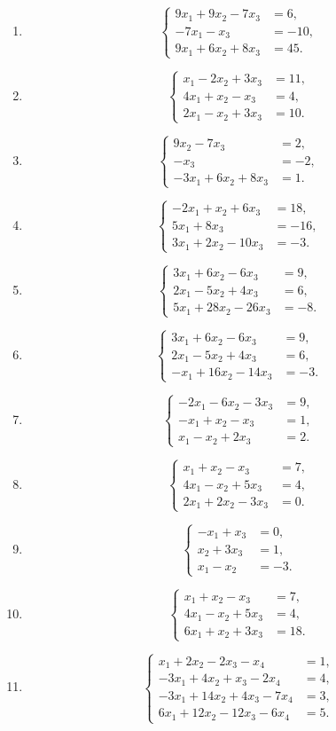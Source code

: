 \documentclass[12pt]{article}
\newcommand{\sistema}[1]{%
\[
\left\{
\begin{aligned}
#1
\end{aligned}
\right.
\]
}
\begin{document}
\begin{enumerate}[label=\textbf{\arabic*.},leftmargin=*]

\item \sistema{
9x_1+9x_2-7x_3&=6,\\
-7x_1-x_3&=-10,\\
9x_1+6x_2+8x_3&=45.
}

\item \sistema{
x_1-2x_2+3x_3&=11,\\
4x_1+x_2-x_3&=4,\\
2x_1-x_2+3x_3&=10.
}

\item \sistema{
9x_2-7x_3&=2,\\
-x_3&=-2,\\
-3x_1+6x_2+8x_3&=1.
}

\item \sistema{
-2x_1+x_2+6x_3&=18,\\
5x_1+8x_3&=-16,\\
3x_1+2x_2-10x_3&=-3.
}

\item \sistema{
3x_1+6x_2-6x_3&=9,\\
2x_1-5x_2+4x_3&=6,\\
5x_1+28x_2-26x_3&=-8.
}

\item \sistema{
3x_1+6x_2-6x_3&=9,\\
2x_1-5x_2+4x_3&=6,\\
-x_1+16x_2-14x_3&=-3.
}

\item \sistema{
-2x_1-6x_2-3x_3&=9,\\
-x_1+x_2-x_3&=1,\\
x_1-x_2+2x_3&=2.
}

\item \sistema{
x_1+x_2-x_3&=7,\\
4x_1-x_2+5x_3&=4,\\
2x_1+2x_2-3x_3&=0.
}

\item \sistema{
-x_1+x_3&=0,\\
x_2+3x_3&=1,\\
x_1-x_2&=-3.
}

\item \sistema{
x_1+x_2-x_3&=7,\\
4x_1-x_2+5x_3&=4,\\
6x_1+x_2+3x_3&=18.
}

\item \sistema{
x_1+2x_2-2x_3-x_4&=1,\\
-3x_1+4x_2+x_3-2x_4&=4,\\
-3x_1+14x_2+4x_3-7x_4&=3,\\
6x_1+12x_2-12x_3-6x_4&=5.
}


\end{enumerate}
\end{document}

